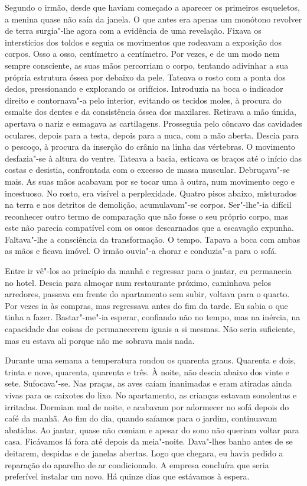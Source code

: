 Segundo o irmão, desde que haviam começado a aparecer os primeiros
esqueletos, a menina quase não saía da janela. O que antes era apenas um
monótono revolver de terra surgia"-lhe agora com a evidência de uma
revelação. Fixava os interstícios dos toldos e seguia os movimentos que
rodeavam a exposição dos corpos. Osso a osso, centímetro a centímetro.
Por vezes, e de um modo nem sempre consciente, as suas mãos percorriam o
corpo, tentando adivinhar a sua própria estrutura óssea por debaixo da
pele. Tateava o rosto com a ponta dos dedos, pressionando e explorando
os orifícios. Introduzia na boca o indicador direito e contornava"-a
pelo interior, evitando os tecidos moles, à procura do esmalte dos
dentes e da consistência óssea dos maxilares. Retirava a mão úmida,
apertava o nariz e esmagava as cartilagens. Prosseguia pelo côncavo das
cavidades oculares, depois para a testa, depois para a nuca, com a mão
aberta. Descia para o pescoço, à procura da inserção do crânio na linha
das vértebras. O movimento desfazia"-se à altura do ventre. Tateava a
bacia, esticava os braços até o início das costas e desistia,
confrontada com o excesso de massa muscular. Debruçava"-se mais. As suas
mãos acabavam por se tocar uma à outra, num movimento cego e incestuoso.
No rosto, era visível a perplexidade. Quatro pisos abaixo, misturados na
terra e nos detritos de demolição, acumulavam"-se corpos. Ser"-lhe"-ia
difícil reconhecer outro termo de comparação que não fosse o seu próprio
corpo, mas este não parecia compatível com os ossos descarnados que a
escavação expunha. Faltava"-lhe a consciência da transformação. O tempo.
Tapava a boca com ambas as mãos e ficava imóvel. O irmão ouvia"-a chorar
e conduzia"-a para o sofá.

Entre ir vê"-los ao princípio da manhã e regressar para o jantar, eu
permanecia no hotel. Descia para almoçar num restaurante próximo,
caminhava pelos arredores, passava em frente do apartamento sem subir,
voltava para o quarto. Por vezes ia às compras, mas regressava antes do
fim da tarde. Eu sabia o que tinha a fazer. Bastar"-me"-ia esperar,
confiando não no tempo, mas na inércia, na capacidade das coisas de
permanecerem iguais a si mesmas. Não seria suficiente, mas eu estava ali
porque não me sobrava mais nada.

Durante uma semana a temperatura rondou os quarenta graus. Quarenta e
dois, trinta e nove, quarenta, quarenta e três. À noite, não descia
abaixo dos vinte e sete. Sufocava"-se. Nas praças, as aves caíam
inanimadas e eram atiradas ainda vivas para os caixotes do lixo. No
apartamento, as crianças estavam sonolentas e irritadas. Dormiam mal de
noite, e acabavam por adormecer no sofá depois do café da manhã. Ao
fim do dia, quando saíamos para o jardim, continuavam abatidas. Ao
jantar, quase não comiam e apesar do sono não queriam voltar para casa.
Ficávamos lá fora até depois da meia"-noite. Dava"-lhes banho antes de
se deitarem, despidas e de janelas abertas. Logo que chegara, eu havia
pedido a reparação do aparelho de ar condicionado. A empresa concluíra
que seria preferível instalar um novo. Há quinze dias que estávamos à
espera.

